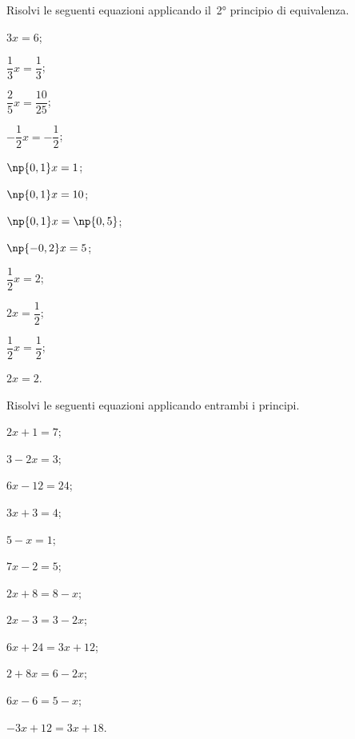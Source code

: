 \begin{esercizio}[\Ast]
\label{ese:15.5}
Risolvi le seguenti equazioni applicando il~2° principio di equivalenza.
\begin{multicols}{4}
\begin{enumeratea}
 \item $3x=6$;
 \item $\dfrac{1}{3}x=\dfrac{1}{3}$;
 \item $\dfrac{2}{5}x=\dfrac{10}{25}$;
 \item $-{\dfrac{1}{2}}x=-{\dfrac{1}{2}}$;
 \item $\np{0,1}x=1$;
 \item $\np{0,1}x=10$;
 \item $\np{0,1}x=\np{0,5}$;
 \item $\np{-0,2}x=5$;
 \item $\dfrac{1}{2}x=2$;
 \item $2x=\dfrac{1}{2}$;
 \item $\dfrac{1}{2}x=\dfrac{1}{2}$;
 \item $2x=2$.
\end{enumeratea}
\end{multicols}
\end{esercizio}

\begin{esercizio}[\Ast]
\label{ese:15.6}
Risolvi le seguenti equazioni applicando entrambi i principi.
\begin{multicols}{3}
\begin{enumeratea}
 \item $2x+1=7$;
 \item $3-2x=3$;
 \item $6x-12=24$;
 \item $3x+3=4$;
 \item $5-x=1$;
 \item $7x-2=5$;
 \item $2x+8=8-x$;
 \item $2x-3=3-2x$;
 \item $6x+24=3x+12$;
 \item $2+8x=6-2x$;
 \item $6x-6=5-x$;
 \item $-3x+12=3x+18$.
\end{enumeratea}
\end{multicols}
\end{esercizio}


